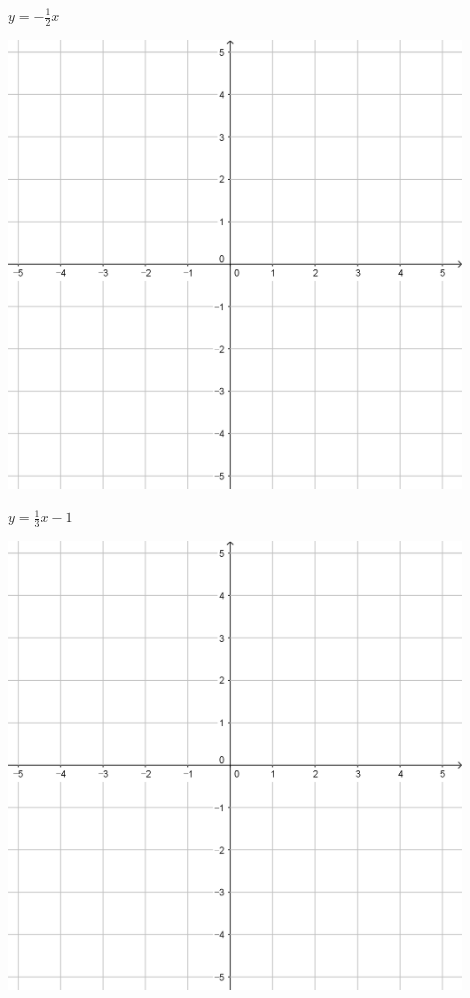 \documentclass{oblivoir}
\begin{document}
\begin{minipage}{0.45\textwidth}\centering
\(y=-\frac12x\)
\par\bigskip\includegraphics[width=0.9\textwidth]{55}
\end{minipage}
\begin{minipage}{0.45\textwidth}\centering
\(y=\frac13x-1\)
\par\bigskip\includegraphics[width=0.9\textwidth]{55}
\end{minipage}\bigskip\bigskip\par
\end{document}
